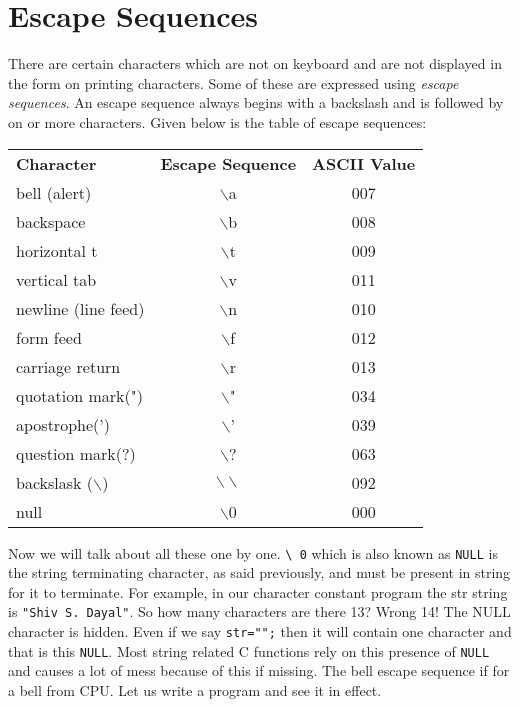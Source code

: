 \section{Escape Sequences}
There are certain characters which are not on keyboard and are not displayed in
the form on printing characters. Some of these are expressed using
\textit{escape sequences}. An escape sequence always begins with a backslash
and is followed by on or more characters. Given below is the table of escape
sequences:

\begin{table}[H]
\begin{center}
\caption{Escape Sequences}
\begin{longtable}{lcc}
\textbf{Character}&\textbf{Escape Sequence}&\textbf{ASCII Value}\\
bell (alert)&$\backslash$a&007\\
backspace&$\backslash$b&008\\
horizontal t&$\backslash$t&009\\
vertical tab&$\backslash$v&011\\
newline (line feed)&$\backslash$n&010\\
form feed&$\backslash$f&012\\
carriage return&$\backslash$r&013\\
quotation mark(")&$\backslash$"&034\\
apostrophe(')&$\backslash$'&039\\
question mark(?)&$\backslash$?&063\\
backslask ($\backslash$)&$\backslash\backslash$&092\\
null&$\backslash$0&000
\end{longtable}
\end{center}
\end{table}

Now we will talk about all these one by one. \texttt{\textbackslash{} 0} which
is also known as \texttt{NULL} is the string terminating character, as said
previously, and must be present in string for it to terminate. For example, in
our character constant program the str string is \texttt{"Shiv S. Dayal"}. So
how many characters are there 13? Wrong 14! The NULL character is hidden. Even
if we say \texttt{str="";} then it will contain one character and that is this
\texttt{NULL}. Most string related C functions rely on this presence of
\texttt{NULL} and causes a lot of mess because of this if missing. The bell
escape sequence if for a bell from CPU. Let us write a program and see it in
effect.

